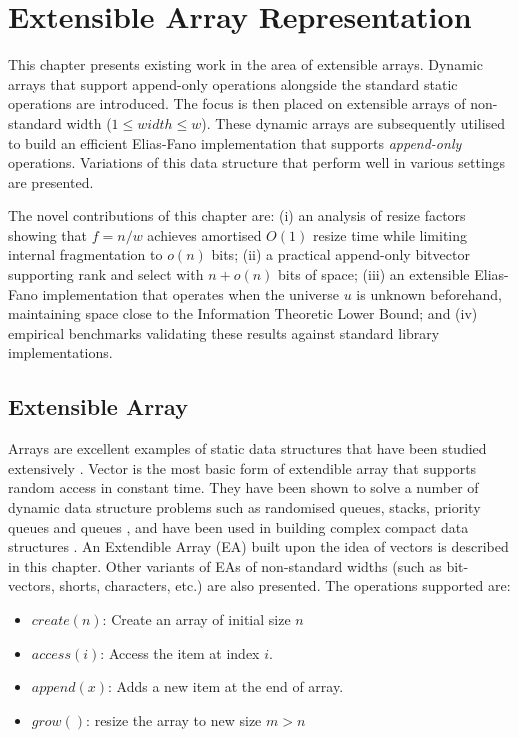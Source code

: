 \chapter{Extensible Array Representation}
\label{chap:extensible}

This chapter presents existing work in the area of extensible arrays. Dynamic arrays that support append-only operations alongside the standard static operations are introduced. The focus is then placed on extensible arrays of non-standard width ($1\leq width \leq w$). These dynamic arrays are subsequently utilised to build an efficient Elias-Fano implementation that supports \textit{append-only} operations. Variations of this data structure that perform well in various settings are presented.

The novel contributions of this chapter are: (i) an analysis of resize factors showing that $f = n/w$ achieves amortised $O(1)$ resize time while limiting internal fragmentation to $o(n)$ bits; (ii) a practical append-only bitvector supporting rank and select with $n + o(n)$ bits of space; (iii) an extensible Elias-Fano implementation that operates when the universe $u$ is unknown beforehand, maintaining space close to the Information Theoretic Lower Bound; and (iv) empirical benchmarks validating these results against standard library implementations.
\section{Extensible Array}
 Arrays are excellent examples of static data structures that have been studied extensively \cite{Navarro_2016}. Vector is the most basic form of extendible array that supports random access in constant time. They have been shown to solve a number of dynamic data structure problems such as randomised queues, stacks, priority queues and queues \cite{Brodnik_1999, Navarro_2016, Brodnik_1993}, and have been used in building complex compact data structures \cite{Munro_2001, Raman_2003}. An Extendible Array (EA) built upon the idea of vectors is described in this chapter. Other variants of EAs of non-standard widths (such as bit-vectors, shorts, characters, etc.) are also presented. The operations supported are:
\begin{itemize}
    \item $create(n)$: Create an array of initial size $n$
    \item $access(i)$: Access the item at index $i$.
    \item $append(x)$: Adds a new item at the end of array.
    \item $grow()$: resize the array to new size $m > n$
\end{itemize}
